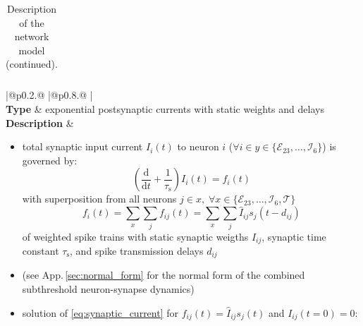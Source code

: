 \documentclass[10pt,a4paper,twoside,american]{article}
\theoremstyle{definitionstyle}
\newcommand{\diff}{\ensuremath{\text{d}}}
\newcommand{\tauS}{\tau_\text{s}}
\begin{document}
\begin{table}[H]
\begin{tabular}{
  |@{\hspace*{\marg}}p{}@{\hspace*{\marg}}
  |@{\hspace*{\marg}}p{}@{\hspace*{\marg}}
  |}
\end{tabular}
\caption{Description of the network model (continued).}
\label{tab:model_description_2}
\end{table}
\clearpage
\begin{table}
\begin{tabular}{
  |@{\hspace*{\marg}}p{}@{\hspace*{\marg}}
  |@{\hspace*{\marg}}p{}@{\hspace*{\marg}}
  |}
  \hline 
  \\
  \hline 
  \textbf{Type} & exponential postsynaptic currents with static weights and delays \\
  \hline 
  \textbf{Description} &
  \begin{itemize}
	\item total synaptic input current $I_i(t)$ to neuron $i$ ($\forall i \in y\in\{\mathcal{E}_{23},\ldots,\mathcal{I}_{6}\}$) is governed by:
		\begin{equation}
			\label{eq:synaptic_current}
			\left(\frac{\diff}{\diff t} + \frac{1}{\tauS}\right) I_{i} (t) = f_{i}(t)
		\end{equation}
		with superposition from all neurons $j \in x,\;\forall x\in\{\mathcal{E}_{23},\ldots,\mathcal{I}_{6}, \mathcal{T}\}$
		\begin{equation}
			f_{i} (t) = \sum_{x} \sum_{j} f_{ij} (t) = \sum_{x} \sum_{j} \hat{I}_{ij} s_{j}(t-d_{ij})
		\end{equation}
                of weighted spike trains with static synaptic weigths $\hat{I}_{ij}$, synaptic time constant $\tauS$, and spike transmission delays $d_{ij}$
        \item[] (see App.\,\ref{sec:normal_form} for the normal form of the combined subthreshold neuron-synapse dynamics)	
	\item solution of \eqref{eq:synaptic_current} for $\displaystyle f_{ij}(t)=\hat{I}_{ij}s_{j}(t)$ and $I_{ij}(t=0)=0$:

\end{itemize}
\end{tabular}
\end{table}
\end{document}
